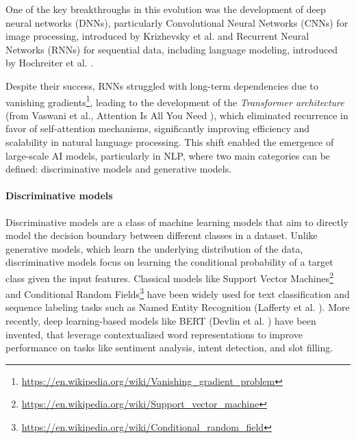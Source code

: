 One of the key breakthroughs in this evolution was the development of deep neural
networks (DNNs), particularly Convolutional Neural Networks (CNNs) for image
processing, introduced by Krizhevsky et al. \cite{articleCNN} and Recurrent
Neural Networks (RNNs) for sequential data, including language modeling,
introduced by Hochreiter et al. \cite{articleRNN}.

Despite their success, RNNs struggled with long-term dependencies due to
vanishing gradients\footnote{\url{https://en.wikipedia.org/wiki/Vanishing_gradient_problem}},
leading to the development of the \emph{Transformer architecture} (from Vaswani
et al., Attention Is All You Need \cite{vaswani2023attentionneed}), which
eliminated recurrence in favor of self-attention mechanisms, significantly improving
efficiency and scalability in natural language processing. This shift enabled
the emergence of large-scale AI models, particularly in NLP, where two main
categories can be defined: discriminative models and generative models.

\paragraph{Discriminative models}
Discriminative models are a class of machine learning models that aim to
directly model the decision boundary between different classes in a dataset. Unlike
generative models, which learn the underlying distribution of the data, discriminative
models focus on learning the conditional probability of a target class given the
input features. Classical models like Support Vector Machines\footnote{\url{https://en.wikipedia.org/wiki/Support_vector_machine}}
and Conditional Random Fields\footnote{\url{https://en.wikipedia.org/wiki/Conditional_random_field}}
have been widely used for text classification and sequence labeling tasks such
as Named Entity Recognition (Lafferty et al. \cite{crf}). More recently, deep learning-based
models like BERT (Devlin et al. \cite{devlin2019bertpretrainingdeepbidirectional})
have been invented, that leverage contextualized word representations to improve
performance on tasks like sentiment analysis, intent detection, and slot filling.

